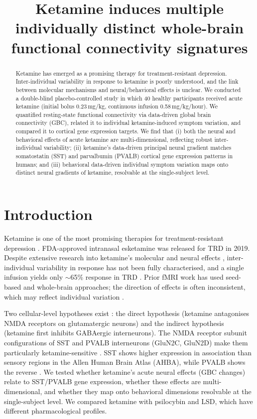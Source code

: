 \documentclass[11pt]{article}
\title{Ketamine induces multiple individually distinct whole-brain functional connectivity signatures}
\author{}
\date{}
\begin{document}
\maketitle

\begin{abstract}
Ketamine has emerged as a promising therapy for treatment-resistant depression. Inter-individual variability in response to ketamine is poorly understood, and the link between molecular mechanisms and neural/behavioral effects is unclear. We conducted a double-blind placebo-controlled study in which 40 healthy participants received acute ketamine (initial bolus 0.23\,mg/kg, continuous infusion 0.58\,mg/kg/hour). We quantified resting-state functional connectivity via data-driven global brain connectivity (GBC), related it to individual ketamine-induced symptom variation, and compared it to cortical gene expression targets. We find that (i) both the neural and behavioral effects of acute ketamine are multi-dimensional, reflecting robust inter-individual variability; (ii) ketamine's data-driven principal neural gradient matches somatostatin (SST) and parvalbumin (PVALB) cortical gene expression patterns in humans; and (iii) behavioral data-driven individual symptom variation maps onto distinct neural gradients of ketamine, resolvable at the single-subject level.
\end{abstract}

\section{Introduction}
Ketamine is one of the most promising therapies for treatment-resistant depression \citep{r1}. FDA-approved intranasal esketamine was released for TRD in 2019. Despite extensive research into ketamine's molecular and neural effects \citep{r2,r3}, inter-individual variability in response has not been fully characterised, and a single infusion yields only $\sim$65\% response in TRD \citep{r4}. Prior fMRI work has used seed-based \citep{r7,r8,r9,r10,r11,r12,r13,r14,r15,r16,r17,r18,r19} and whole-brain \citep{r22,r28,r29,r30} approaches; the direction of effects is often inconsistent, which may reflect individual variation \citep{r19}.

Two cellular-level hypotheses exist \citep{r37}: the direct hypothesis (ketamine antagonises NMDA receptors on glutamatergic neurons) and the indirect hypothesis (ketamine first inhibits GABAergic interneurons). The NMDA receptor subunit configurations of SST and PVALB interneurons (GluN2C, GluN2D) make them particularly ketamine-sensitive \citep{r40,r41,r42,r43}. SST shows higher expression in association than sensory regions in the Allen Human Brain Atlas (AHBA), while PVALB shows the reverse \citep{r48,r49}. We tested whether ketamine's acute neural effects (GBC changes) relate to SST/PVALB gene expression, whether these effects are multi-dimensional, and whether they map onto behavioral dimensions resolvable at the single-subject level. We compared ketamine with psilocybin \citep{r33,r34,r35,r36} and LSD, which have different pharmacological profiles.
\end{document}

